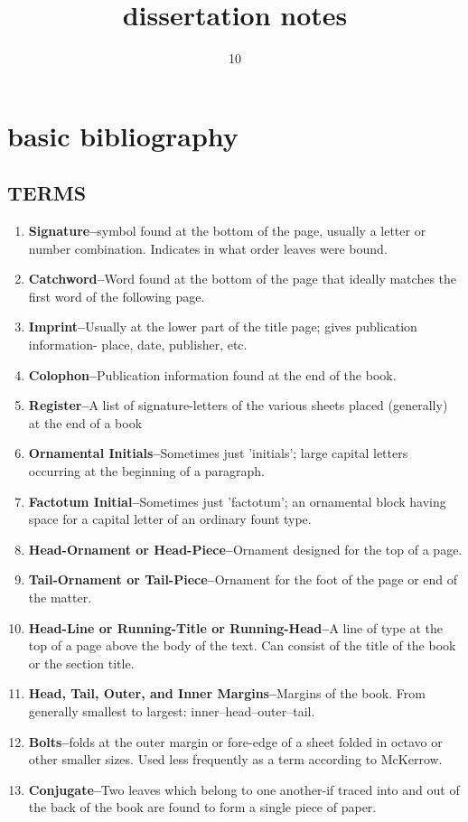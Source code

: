\documentclass[course, english]{Notes}
\title{dissertation notes}
\date{10}{12}{2016}
\begin{document}
\section{basic bibliography}
\subsection{TERMS}
\begin{enumerate}
\item \textbf{Signature--}symbol found at the bottom of the page, usually a letter or number combination. Indicates in what order leaves were bound.
\item \textbf{Catchword--}Word found at the bottom of the page that ideally matches the first word of the following page. 
\item \textbf{Imprint--}Usually at the lower part of the title page; gives publication information- place, date, publisher, etc.
\item \textbf{Colophon--}Publication information found at the end of the book.
\item \textbf{Register--}A list of signature-letters of the various sheets placed (generally) at the end of a book
\item \textbf{Ornamental Initials--}Sometimes just 'initials'; large capital letters occurring at the beginning of a paragraph.
\item \textbf{Factotum Initial--}Sometimes just 'factotum'; an ornamental block having space for a capital letter of an ordinary fount type.
\item \textbf{Head-Ornament or Head-Piece--}Ornament designed for the top of a page.
\item \textbf{Tail-Ornament or Tail-Piece--}Ornament for the foot of the page or end of the matter.
\item \textbf{Head-Line or Running-Title or Running-Head--}A line of type at the top of a page above the body of the text. Can consist of the title of the book or the section title.
\item \textbf{Head, Tail, Outer, and Inner Margins--}Margins of the book. From generally smallest to largest: inner--head--outer--tail.  
\item \textbf{Bolts--}folds at the outer margin or fore-edge of a sheet folded in octavo or other smaller sizes. Used less frequently as a term according to McKerrow.
\item \textbf{Conjugate--}Two leaves which belong to one another-if traced into and out of the back of the book are found to form a single piece of paper. 

\end{enumerate}
\end{document}
